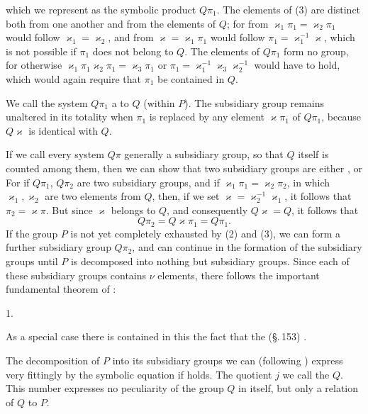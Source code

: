 which we represent as the symbolic product $Q\pi_1$. The elements
of (3) are distinct both from one another and from the elements of
$Q$; for from $\varkappa_1\pi_1 = \varkappa_2\pi_1$ would follow $\varkappa_1 = \varkappa_2$, and from
$\varkappa = \varkappa_1\pi_1$ would follow $\pi_1 = \varkappa_1^{-1}\varkappa$, which is not possible if
$\pi_1$ does not belong to $Q$. The elements of $Q\pi_1$ form no
group, for otherwise $\varkappa_1\pi_1\varkappa_2\pi_1 = \varkappa_3\pi_1$ or $\pi_1 = \varkappa_1^{-1}\varkappa_3\varkappa_2^{-1}$
would have to hold, which would again require that $\pi_1$ be contained in $Q$.

We call the system $Q\pi_1$ a  to $Q$
(within $P$). The subsidiary group remains unaltered in its
totality when $\pi_1$ is replaced by any element $\varkappa\pi_1$ of $Q\pi_1$,
because $Q\varkappa$ is identical with $Q$.

If we call every system $Q\pi$ generally a subsidiary group,
so that $Q$ itself is counted among them, then we can show
that two subsidiary groups are either , or
 For if $Q\pi_1$,
$Q\pi_2$ are two subsidiary groups, and if $\varkappa_1\pi_1 = \varkappa_2\pi_2$, in which $\varkappa_1, \varkappa_2$ are two
elements from $Q$, then, if we set $\varkappa = \varkappa_2^{-1}\varkappa_1$, it follows that
$\pi_2 = \varkappa\pi$. But since $\varkappa$ belongs to $Q$, and consequently $Q\varkappa = Q$,
it follows that
\[
Q\pi_2 = Q\varkappa\pi_1 = Q\pi_1.
\]
If the group $P$ is not yet completely exhausted by (2) and (3), we can form a further subsidiary group $Q\pi_2$,
and can continue in the formation of the subsidiary groups until $P$ is decomposed into nothing but subsidiary groups. Since each of these
subsidiary groups contains $\nu$ elements, there follows the important fundamental theorem of :

1. 

As a special case there is contained in this the fact that the  (\S.\,153) .

The decomposition of $P$ into its subsidiary groups we can
(following ) express very fittingly by the symbolic equation
if
holds. The quotient $j$ we call the 
$Q$. This number expresses no peculiarity of the group $Q$
in itself, but only a relation of $Q$ to $P$.
